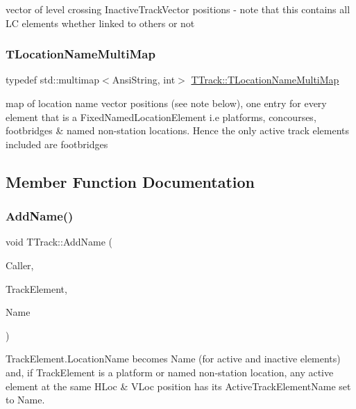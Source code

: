 vector of level crossing Inactive\+Track\+Vector positions -\/ note that this contains all LC elements whether linked to others or not \mbox{\label{class_t_track_ac68eed5a26013072d6852aa2e6d6f33d}} 
\subsubsection{\texorpdfstring{T\+Location\+Name\+Multi\+Map}{TLocationNameMultiMap}}
{\footnotesize\ttfamily typedef std\+::multimap$<$Ansi\+String, int$>$ \mbox{\hyperlink{class_t_track_ac68eed5a26013072d6852aa2e6d6f33d}{T\+Track\+::\+T\+Location\+Name\+Multi\+Map}}}

map of location name vector positions (see note below), one entry for every element that is a Fixed\+Named\+Location\+Element i.\+e platforms, concourses, footbridges \& named non-\/station locations. Hence the only active track elements included are footbridges 

\subsection{Member Function Documentation}
\mbox{\label{class_t_track_a306dfdff414c8edf6f974d21bd9b83ce}} 
\subsubsection{\texorpdfstring{Add\+Name()}{AddName()}}
{\footnotesize\ttfamily void T\+Track\+::\+Add\+Name (\begin{DoxyParamCaption}\item[{int}]{Caller,  }\item[{T\+Track\+Vector\+Iterator}]{Track\+Element,  }\item[{Ansi\+String}]{Name }\end{DoxyParamCaption})}

Track\+Element.\+Location\+Name becomes \textquotesingle{}Name\textquotesingle{} (for active and inactive elements) and, if Track\+Element is a platform or named non-\/station location, any active element at the same H\+Loc \& V\+Loc position has its Active\+Track\+Element\+Name set to \textquotesingle{}Name\textquotesingle{}. \mbox{\label{class_t_track_a607c6164af3158c328dd7c3ae25236c7}} 
